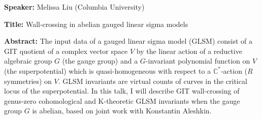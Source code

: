 \documentclass[12pt]{amsart}
\begin{document}
 

{\bf Speaker:} Melissa Liu (Columbia University)

\bigskip

{\bf Title:} Wall-crossing in abelian gauged linear sigma models

\bigskip

{\bf Abstract:}  The input data of a gauged linear sigma model (GLSM) consist of a GIT quotient  of a complex vector space $V$ by the linear action of a reductive algebraic group $G$ (the gauge group) and a $G$-invariant polynomial function on $V$ (the superpotential) which is quasi-homogeneous with respect to a  $\mathbb{C}^*$-action ($R$ symmetries) on $V$.  GLSM invariants are virtual counts of curves in the critical locus of the superpotential. In this talk, I will describe GIT wall-crossing of genus-zero cohomological and K-theoretic GLSM invariants when the gauge group $G$ is abelian, based on joint work with Konstantin Aleshkin. 
\end{document}
